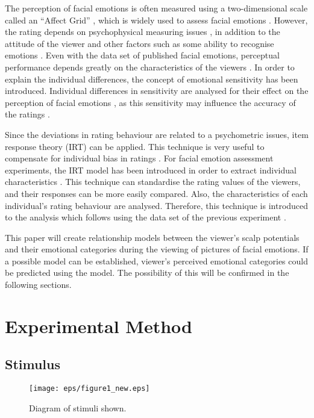 \documentclass[fonts]{icst}
\begin{document}
The perception of facial emotions is often measured using a
two-dimensional scale \cite{russel85} called an ``Affect Grid''
\cite{russel:1989:AG}, which is widely used to assess facial emotions 
\cite{adolphs02}. 
However, the rating depends on psychophysical measuring issues 
\cite{marneweck13},
in addition to the attitude of the viewer and other factors such as some
ability to recognise emotions \cite{schlegel19}. 
Even with the data set of published facial emotions, perceptual performance
depends greatly on the characteristics of the viewers \cite{biehl97}. 
In order to explain the individual differences, the concept of emotional 
sensitivity has been introduced. Individual differences in sensitivity
are analysed for their effect on the perception of facial emotions
\cite{gao14,fischer18,rutter19}, as this sensitivity may influence the
accuracy of the ratings \cite{lyusin16}.  

Since the deviations in rating behaviour are related to a psychometric
issues, item response theory (IRT) \cite{linn89} can be applied. This
technique is very useful to compensate for individual bias in ratings
\cite{uto18h}.  
For facial emotion assessment experiments, the IRT model has been
introduced in order to extract individual characteristics \cite{suzuki06}. 
This technique can standardise the rating values of the viewers, and
their responses can be more easily compared. Also, the characteristics
of each individual's rating behaviour are analysed. 
Therefore, this technique is introduced to the analysis which follows
using the data set of the previous experiment \cite{minoru19}.  

This paper will create relationship models between the viewer's scalp
potentials and their emotional categories during the viewing of pictures
of facial emotions. 
If a possible model can be established, viewer's perceived
emotional categories could be predicted using the model. The
possibility of this will be confirmed in the following sections.


\section{Experimental Method}

\subsection{Stimulus}

\begin{figure}[tb]
   \begin{center}
    \texttt{[image: eps/figure1\_new.eps]}
   \end{center}
  \caption{Diagram of stimuli shown.}
  \label{fig:diagram}
\end{figure}
\end{document}
